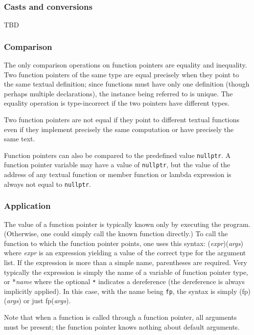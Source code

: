 {\subsubsection{Casts and conversions}

TBD

\subsubsection{Comparison}

The only comparison operations on function pointers are 
equality and inequality. Two function pointers of the 
same type are equal precisely when they point to the same
textual definition; since functions must have only one
definition (though perhaps multiple declarations), 
the instance being referred to is unique. 
The equality operation is type-incorrect if the two
pointers have different types.

Two function pointers are not equal if they point to 
different textual functions even if they implement precisely the
same computation or have precisely the same text.

Function pointers can also be compared to the predefined value \lstinline|nullptr|. A function pointer variable may have
a value of \lstinline|nullptr|, but the value of the address
of any textual function or member function or lambda expression
 is always not
equal to \lstinline|nullptr|.

\subsubsection{Application}

The value of a function pointer is typically known only by
executing the program. (Otherwise, one could simply call the
known function directly.) To call the function to which the
function pointer points, one uses this syntax:
(\emph{expr})(\emph{args}) where \emph{expr} is an expression yielding a value of the correct type for the argument list. If the expression is
more than a simple name, parentheses are required.
Very typically the expression is simply the name of a variable of function pointer type, or *\emph{name} where the optional \lstinline|*| indicates a dereference (the dereference is always implicitly applied).
In this case, with the name being \lstinline|fp|, the syntax is simply (fp)(\emph{args}) or just
fp(\emph{args}).

Note that when a function is called through a function pointer, all arguments must be present; the function pointer knows nothing about
default arguments.

}
